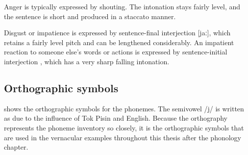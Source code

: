  


Anger is typically expressed by shouting.  The intonation stays fairly level, and the sentence is short and produced in a staccato manner.

Disgust or impatience is expressed by sentence-final interjection  [jaː], which retains a fairly level pitch and can be lengthened considerably.  An impatient reaction to someone else's words or actions is expressed by sentence-initial interjection , which has a very sharp falling intonation.







\subsection{Orthographic symbols}\label{sec:2:y:x}


 shows the orthographic symbols for the phonemes. The semivowel /j/ is written as  due to the influence of Tok Pisin and English.  Because the orthography represents the phoneme inventory so closely, it is the orthographic symbols that are used in the vernacular examples throughout this thesis after the phonology chapter.


